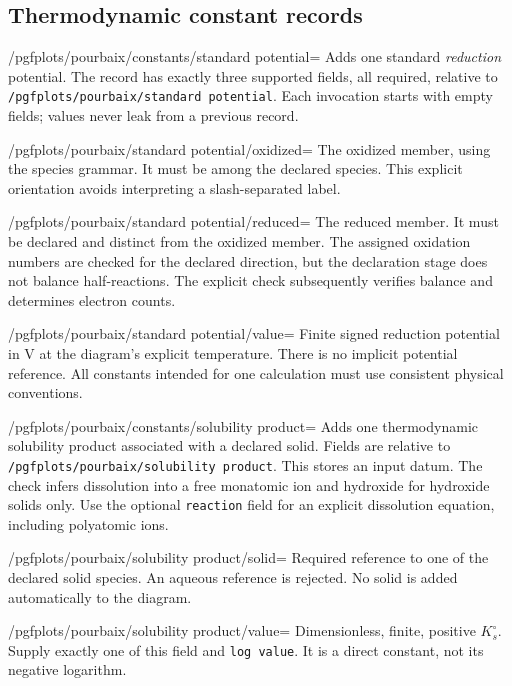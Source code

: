 \documentclass[a4paper,11pt]{ltxdoc}
\begin{document}
\subsection{Thermodynamic constant records}
\begin{key}{/pgfplots/pourbaix/constants/standard potential=}
Adds one standard \emph{reduction} potential. The record has exactly three
supported fields, all required, relative to
\texttt{/pgfplots/pourbaix/standard potential}. Each invocation starts with empty
fields; values never leak from a previous record.
\end{key}
\begin{key}{/pgfplots/pourbaix/standard potential/oxidized=}
The oxidized member, using the species grammar. It must be among the declared
species. This explicit orientation avoids interpreting a slash-separated label.
\end{key}
\begin{key}{/pgfplots/pourbaix/standard potential/reduced=}
The reduced member. It must be declared and distinct from the oxidized member.
The assigned oxidation numbers are checked for the declared direction, but the
declaration stage does not balance half-reactions. The explicit check
subsequently verifies balance and determines electron counts.
\end{key}
\begin{key}{/pgfplots/pourbaix/standard potential/value=}
Finite signed reduction potential in V at the diagram's explicit temperature.
There is no implicit potential reference. All constants intended for one
calculation must use consistent physical conventions.
\end{key}

\begin{key}{/pgfplots/pourbaix/constants/solubility product=}
Adds one thermodynamic solubility product associated with a declared solid.
Fields are relative to \texttt{/pgfplots/pourbaix/solubility product}. This stores
an input datum. The check infers dissolution into a free monatomic ion and
hydroxide for hydroxide solids only. Use the optional \texttt{reaction} field
for an explicit dissolution equation, including polyatomic ions.
\end{key}
\begin{key}{/pgfplots/pourbaix/solubility product/solid=}
Required reference to one of the declared solid species. An aqueous reference
is rejected. No solid is added automatically to the diagram.
\end{key}
\begin{key}{/pgfplots/pourbaix/solubility product/value=}
Dimensionless, finite, positive $K_s^\circ$. Supply exactly one of this field
and \texttt{log value}. It is a direct constant, not its negative logarithm.
\end{key}
\end{document}

